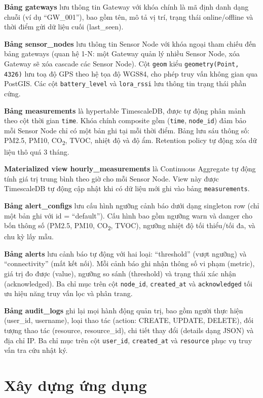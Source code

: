\documentclass[../DoAn.tex]{subfiles}
\begin{document}
\textbf{Bảng gateways} lưu thông tin Gateway với khóa chính là mã định danh dạng chuỗi (ví dụ ``GW\_001''), bao gồm tên, mô tả vị trí, trạng thái online/offline và thời điểm gửi dữ liệu cuối (last\_seen).

\textbf{Bảng sensor\_nodes} lưu thông tin Sensor Node với khóa ngoại tham chiếu đến bảng gateways (quan hệ 1-N: một Gateway quản lý nhiều Sensor Node, xóa Gateway sẽ xóa cascade các Sensor Node). Cột \texttt{geom} kiểu \texttt{geometry(Point, 4326)} lưu toạ độ GPS theo hệ tọa độ WGS84, cho phép truy vấn không gian qua PostGIS. Các cột \texttt{battery\_level} và \texttt{lora\_rssi} lưu thông tin trạng thái phần cứng.

\textbf{Bảng measurements} là hypertable TimescaleDB, được tự động phân mảnh theo cột thời gian \texttt{time}. Khóa chính composite gồm (\texttt{time}, \texttt{node\_id}) đảm bảo mỗi Sensor Node chỉ có một bản ghi tại mỗi thời điểm. Bảng lưu sáu thông số: PM2.5, PM10, CO\textsubscript{2}, TVOC, nhiệt độ và độ ẩm. Retention policy tự động xóa dữ liệu thô quá 3 tháng.

\textbf{Materialized view hourly\_measurements} là Continuous Aggregate tự động tính giá trị trung bình theo giờ cho mỗi Sensor Node. View này được TimescaleDB tự động cập nhật khi có dữ liệu mới ghi vào bảng \texttt{measurements}.

\textbf{Bảng alert\_configs} lưu cấu hình ngưỡng cảnh báo dưới dạng singleton row (chỉ một bản ghi với id = ``default''). Cấu hình bao gồm ngưỡng warn và danger cho bốn thông số (PM2.5, PM10, CO\textsubscript{2}, TVOC), ngưỡng nhiệt độ tối thiểu/tối đa, và chu kỳ lấy mẫu.

\textbf{Bảng alerts} lưu cảnh báo tự động với hai loại: ``threshold'' (vượt ngưỡng) và ``connectivity'' (mất kết nối). Mỗi cảnh báo ghi nhận thông số vi phạm (metric), giá trị đo được (value), ngưỡng so sánh (threshold) và trạng thái xác nhận (acknowledged). Ba chỉ mục trên cột \texttt{node\_id}, \texttt{created\_at} và \texttt{acknowledged} tối ưu hiệu năng truy vấn lọc và phân trang.

\textbf{Bảng audit\_logs} ghi lại mọi hành động quản trị, bao gồm người thực hiện (user\_id, username), loại thao tác (action: CREATE, UPDATE, DELETE), đối tượng thao tác (resource, resource\_id), chi tiết thay đổi (details dạng JSON) và địa chỉ IP. Ba chỉ mục trên cột \texttt{user\_id}, \texttt{created\_at} và \texttt{resource} phục vụ truy vấn tra cứu nhật ký.

\section{Xây dựng ứng dụng}
\label{section:4.3}
\end{document}
